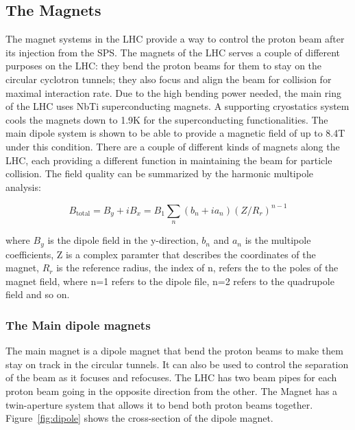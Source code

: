 \subsection{The Magnets}
The magnet systems in the LHC provide a way to control the proton beam after its injection from the SPS. The magnets of the LHC serves a couple of different purposes on the LHC: they bend the proton beams for them to stay on the circular cyclotron tunnels; they also focus and align the beam for collision for maximal interaction rate. Due to the high bending power needed, the main ring of the LHC uses NbTi superconducting magnets.  A supporting cryostatics system cools the magnets down to 1.9K
for the superconducting functionalities. The main dipole system is shown to be able to provide a magnetic field of up to 8.4T under this condition. There are a couple of different kinds of magnets along the
LHC, each providing a different function in maintaining the beam for particle collision. The field quality can be summarized by the harmonic multipole analysis: 

\begin{equation}
 B_\textrm{total} = B_y+ iB_x  = B_1\sum_n(b_{n} + i a_{n})(Z/R_{r})^{n-1}
\end{equation}

where $B_y$ is the dipole field in the y-direction, $b_{n}$ and $a_n$ is the multipole coefficients, Z is a complex paramter that describes the coordinates of the magnet, $R_{r}$ is the reference radius, the index of n, refers the to the poles of the magnet field, where n=1 refers to the dipole file, n=2 refers to the quadrupole field and so on. 

\subsubsection*{The Main dipole magnets}
The main magnet is a dipole magnet that bend the proton beams to make them stay on track in the circular tunnels. It can also be used to control the separation of the beam as it focuses and refocuses.
The LHC has two beam pipes for each proton beam going in the opposite direction from the other. The Magnet has a twin-aperture system that allows it to bend both proton beams together. Figure~\ref{fig:dipole} shows the cross-section of the dipole magnet. 

